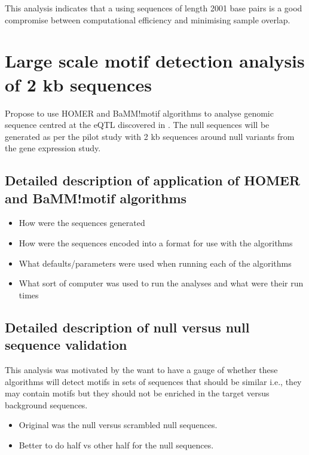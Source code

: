 \documentclass[12pt, onecolumn, oneside]{gsajnl}
\begin{document}
This analysis indicates that a using sequences of length 2001 base pairs is a good compromise between computational efficiency and minimising sample
overlap.
 

\section{Large scale motif detection analysis of 2 kb sequences}

Propose to use HOMER  \citep{heinz2010simple} and BaMM!motif algorithms \citep{siebert2016bayesian} to analyse genomic sequence centred at 
the eQTL discovered in \citet{lloyd2017genetic}. The null sequences will be generated as per the pilot study with 2 kb sequences around null variants from
the \citet{lloyd2017genetic} gene expression study.

\subsection{Detailed description of application of HOMER and  BaMM!motif algorithms}

\begin{itemize}
\item How were the sequences generated
\item How were the sequences encoded into a format for use with the algorithms
\item What defaults/parameters were used when running each of the algorithms
\item What sort of computer was used to run the analyses and what were their run times
\end{itemize}

\subsection{Detailed description of null versus null sequence validation}

This analysis was motivated by the want to have a gauge of whether these algorithms will detect motifs in sets of
sequences that should be similar i.e., they may contain motifs but they should not be enriched in the target versus
background sequences.

\begin{itemize}
\item Original was the null versus scrambled null sequences. 
\item Better to do half vs other half for the null sequences.
\end{itemize}
\end{document}
